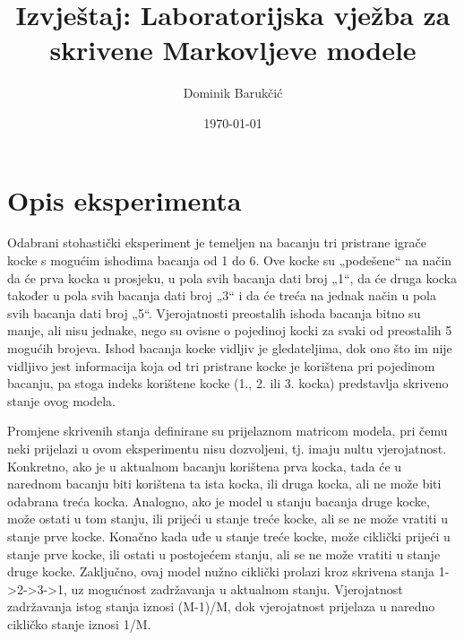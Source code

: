 \documentclass[12pt]{article}
\title{Izvještaj: Laboratorijska vježba za skrivene Markovljeve modele}
\author{Dominik Barukčić}
\date{\today}
\begin{document}
	
	\maketitle
	
%		
%	
%	
	
	
	
	\section{Opis eksperimenta}
	Odabrani stohastički eksperiment je temeljen na bacanju tri pristrane igrače kocke s mogućim ishodima bacanja od 1 do 6. Ove kocke su „podešene“ na način da će prva kocka u prosjeku, u pola svih bacanja dati broj „1“, da će druga kocka također u pola svih bacanja dati broj „3“ i da će treća na jednak način u pola svih bacanja dati broj „5“. Vjerojatnosti preostalih ishoda bacanja bitno su manje, ali nisu jednake, nego su ovisne o pojedinoj kocki za svaki od preostalih 5 mogućih brojeva. Ishod bacanja kocke vidljiv je gledateljima, dok ono što im nije vidljivo jest informacija koja od tri pristrane kocke je korištena pri pojedinom bacanju, pa stoga indeks korištene kocke (1., 2. ili 3. kocka) predstavlja skriveno stanje ovog modela.
	
	Promjene skrivenih stanja definirane su prijelaznom matricom modela, pri čemu neki prijelazi u ovom eksperimentu nisu dozvoljeni, tj. imaju nultu vjerojatnost. Konkretno, ako je u aktualnom bacanju korištena prva kocka, tada će u narednom bacanju biti korištena ta ista kocka, ili druga kocka, ali ne može biti odabrana treća kocka. Analogno, ako je model u stanju bacanja druge kocke, može ostati u tom stanju, ili prijeći u stanje treće kocke, ali se ne može vratiti u stanje prve kocke. Konačno kada uđe u stanje treće kocke, može ciklički prijeći u stanje prve kocke, ili ostati u postojećem stanju, ali se ne može vratiti u stanje druge kocke. Zaključno, ovaj model nužno ciklički prolazi kroz skrivena stanja 1->2->3->1, uz mogućnost zadržavanja u aktualnom stanju. Vjerojatnost zadržavanja istog stanja iznosi (M-1)/M, dok vjerojatnost prijelaza u naredno cikličko stanje iznosi 1/M.
	
\end{document}
